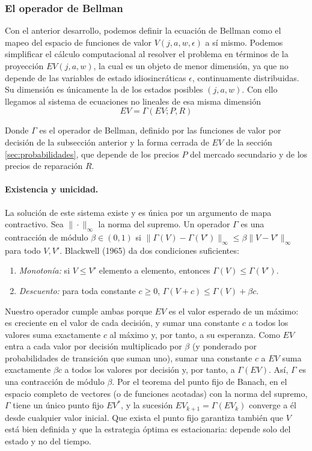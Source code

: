 \documentclass{article}
\begin{document}
\subsubsection{El operador de Bellman}

Con el anterior desarrollo, podemos definir la ecuación de Bellman como el mapeo del espacio de funciones de valor $V(j,a,w,\epsilon)$ a sí mismo. Podemos simplificar el cálculo computacional al resolver el problema en términos de la proyección $EV(j,a,w)$, la cual es un objeto de menor dimensión, ya que no depende de las variables de estado idiosincráticas $\epsilon$, continuamente distribuidas. Su dimensión es únicamente la de los estados posibles $(j,a,w)$. Con ello llegamos al sistema de ecuaciones no lineales de esa misma dimensión
$$EV=\Gamma(EV;P,R)$$

Donde $\Gamma$ es el operador de Bellman, definido por las funciones de valor por decisión de la subsección anterior y la forma cerrada de $EV$ de la sección \ref{sec:probabilidades}, que depende de los precios $P$ del mercado secundario y de los precios de reparación $R$.

\paragraph{Existencia y unicidad.} La solución de este sistema existe y es única por un argumento de mapa contractivo. Sea $\|\cdot\|_\infty$ la norma del supremo. Un operador $\Gamma$ es una contracción de módulo $\beta\in(0,1)$ si $\|\Gamma(V)-\Gamma(V')\|_\infty\le\beta\|V-V'\|_\infty$ para todo $V,V'$. Blackwell (1965) da dos condiciones suficientes:
\begin{enumerate}
    \item \textit{Monotonía:} si $V\le V'$ elemento a elemento, entonces $\Gamma(V)\le\Gamma(V')$.
    \item \textit{Descuento:} para toda constante $c\ge0$, $\Gamma(V+c)\le\Gamma(V)+\beta c$.
\end{enumerate}
Nuestro operador cumple ambas porque $EV$ es el valor esperado de un máximo: es creciente en el valor de cada decisión, y sumar una constante $c$ a todos los valores suma exactamente $c$ al máximo y, por tanto, a su esperanza. Como $EV$ entra a cada valor por decisión multiplicado por $\beta$ (y ponderado por probabilidades de transición que suman uno), sumar una constante $c$ a $EV$ suma exactamente $\beta c$ a todos los valores por decisión y, por tanto, a $\Gamma(EV)$. Así, $\Gamma$ es una contracción de módulo $\beta$. Por el teorema del punto fijo de Banach, en el espacio completo de vectores (o de funciones acotadas) con la norma del supremo, $\Gamma$ tiene un único punto fijo $EV^*$, y la sucesión $EV_{k+1}=\Gamma(EV_k)$ converge a él desde cualquier valor inicial. Que exista el punto fijo garantiza también que $V$ está bien definida y que la estrategia óptima es estacionaria: depende solo del estado y no del tiempo.
\end{document}
